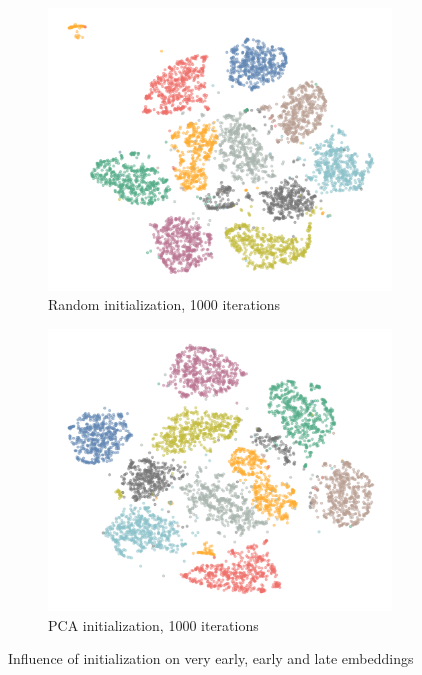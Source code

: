 \begin{figure}[tbp]
  \begin{subfigure}{.45\linewidth}
    \centering
    \includegraphics[width=\linewidth]{img/random_1000_iters-1}
    \caption{Random initialization, 1000 iterations}
  \end{subfigure}
  \begin{subfigure}{.45\linewidth}
    \centering
    \includegraphics[width=\linewidth]{img/pca_1000_iters-1}
    \caption{PCA initialization, 1000 iterations}
  \end{subfigure}
  \caption{Influence of initialization on very early, early and late embeddings}
  \label{fig:pca-random}
\end{figure}

